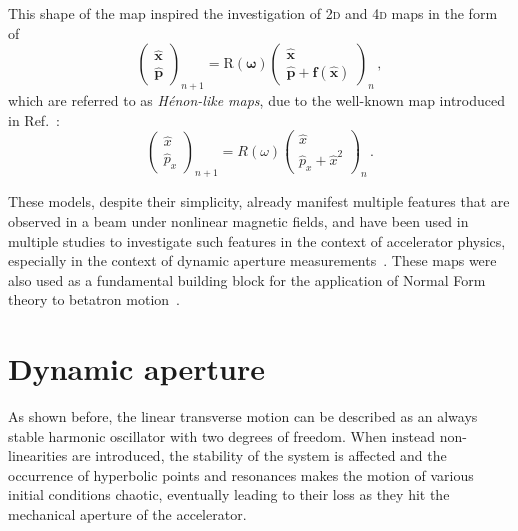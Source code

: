 This shape of the map inspired the investigation of 2\textsc{d} and 4\textsc{d} maps in the form of
\begin{equation}
	\begin{pmatrix}
		\hat{\mathbf{x}} \\ \hat{\mathbf{p}}  
	\end{pmatrix}_{n+1}
	=
	\mathrm{R}(\bm\omega)
		\begin{pmatrix}
			\hat{\mathbf{x}} \\ \hat{\mathbf{p}} + \mathbf{f}(\hat{\mathbf{x}})
	\end{pmatrix}_{n} \,,
	\label{eq:henonlike}
\end{equation}
which are referred to as \textit{Hénon-like maps}, due to the well-known map introduced in Ref.~\cite{henon}:
%
\begin{equation}
	\begin{pmatrix}
		\hat x \\ \hat p_x
	\end{pmatrix}_{n+1}
	=
	R(\omega)
		\begin{pmatrix}
			\hat x \\ \hat p_x + \hat x^2
	\end{pmatrix}_{n} \,.
	\label{eq:simplehenon}
\end{equation}

These models, despite their simplicity, already manifest multiple features that are observed in a beam under nonlinear magnetic fields, and have been used in multiple studies to investigate such features in the context of accelerator physics, especially in the context of dynamic aperture measurements~\cite{PhysRevE.53.4067, invlog}. These maps were also used as a fundamental building block for the application of Normal Form theory to betatron motion~\cite{Bazzani:262179}.

\section{Dynamic aperture}
\label{sec:2:dynamic_aperture}

As shown before, the linear transverse motion can be described as an always stable harmonic oscillator with two degrees of freedom. When instead non-linearities are introduced, the stability of the system is affected and the occurrence of hyperbolic points and resonances makes the motion of various initial conditions chaotic, eventually leading to their loss as they hit the mechanical aperture of the accelerator.

